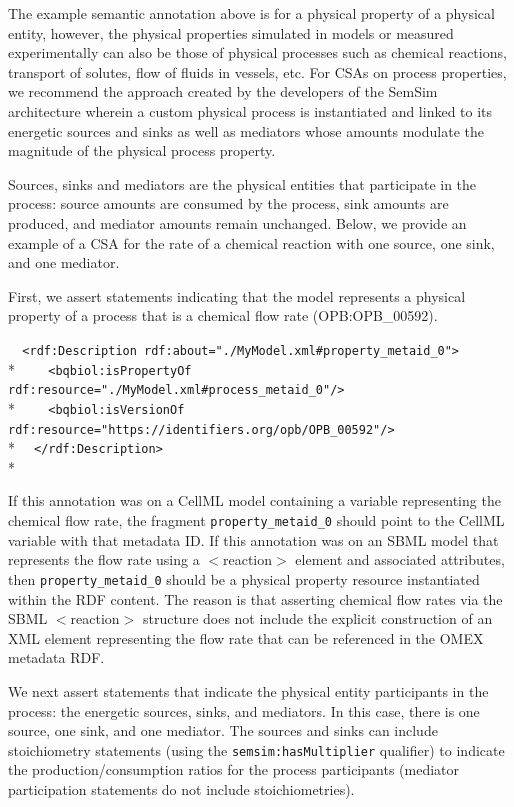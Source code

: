 \documentclass[pdftex,rgb,dvipsnames,svgnames,hyperref,table]{report}
\begin{document}
The example semantic annotation above is for a physical property of a physical entity, however, the physical properties simulated in models or measured experimentally can also be those of physical processes such as chemical reactions, transport of solutes, flow of fluids in vessels, etc. For CSAs on process properties, we recommend the approach created by the developers of the SemSim architecture wherein a custom physical process is instantiated and linked to its energetic sources and sinks as well as mediators whose amounts modulate the magnitude of the physical process property. 

Sources, sinks and mediators are the physical entities that participate in the process: source amounts are consumed by the process, sink amounts are produced, and mediator amounts remain unchanged. Below, we provide  an example of a CSA for the rate of a chemical reaction with one source, one sink, and one mediator. 

First, we assert statements indicating that the model represents a physical property of a process that is a chemical flow rate (OPB:OPB\_00592).

  \verb|  <rdf:Description rdf:about="./MyModel.xml#property_metaid_0">|\\*
  \verb|    <bqbiol:isPropertyOf rdf:resource="./MyModel.xml#process_metaid_0"/>|\\*
  \verb|    <bqbiol:isVersionOf rdf:resource="https://identifiers.org/opb/OPB_00592"/>|\\*
  \verb|  </rdf:Description>|\\*

If this annotation was on a CellML model containing a variable representing the chemical flow rate, the fragment \texttt{property\_metaid\_0} should point to the CellML variable with that metadata ID. If this annotation was on an SBML model that represents the flow rate using a $<$reaction$>$ element and associated attributes, then \texttt{property\_metaid\_0} should be a physical property resource instantiated within the RDF content. The reason is that asserting chemical flow rates via the SBML $<$reaction$>$ structure does not include the explicit construction of an XML element representing the flow rate that can be referenced in the OMEX metadata RDF.

We next assert statements that indicate the physical entity participants in the process: the energetic sources, sinks, and mediators. In this case, there is one source, one sink, and one mediator. The sources and sinks can include stoichiometry statements (using the \texttt{semsim:hasMultiplier} qualifier) to indicate the production/consumption ratios for the process participants (mediator participation statements do not include stoichiometries).
\end{document}
